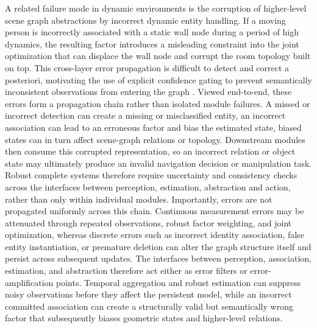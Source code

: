 A related failure mode in dynamic environments is the corruption of higher-level scene graph abstractions by incorrect dynamic entity handling. 
If a moving person is incorrectly associated with a static wall node during a period of high dynamics, the resulting factor introduces a misleading constraint into the joint optimization that can displace the wall node and corrupt the room topology built on top. 
This cross-layer error propagation is difficult to detect and correct a posteriori, motivating the use of explicit confidence gating to prevent semantically inconsistent observations from entering the graph \cite{zhang_outlier_2023}.
Viewed end-to-end, these errors form a propagation chain rather than isolated module failures. 
A missed or incorrect detection can create a missing or misclassified entity, an incorrect association can lead to an erroneous factor and bias the estimated state, biased states can in turn affect scene-graph relations or topology. 
Downstream modules then consume this corrupted representation, so an incorrect relation or object state may ultimately produce an invalid navigation decision or manipulation task. 
Robust complete systems therefore require uncertainty and consistency checks across the interfaces between perception, estimation, abstraction and action, rather than only within individual modules.
Importantly, errors are not propagated uniformly across this chain.
Continuous measurement errors may be attenuated through repeated observations, robust factor weighting, and joint optimization, whereas discrete errors such as incorrect identity association, false entity instantiation, or premature deletion can alter the graph structure itself and persist across subsequent updates.
The interfaces between perception, association, estimation, and abstraction therefore act either as error filters or error-amplification points.
Temporal aggregation and robust estimation can suppress noisy observations before they affect the persistent model, while an incorrect committed association can create a structurally valid but semantically wrong factor that subsequently biases geometric states and higher-level relations.

